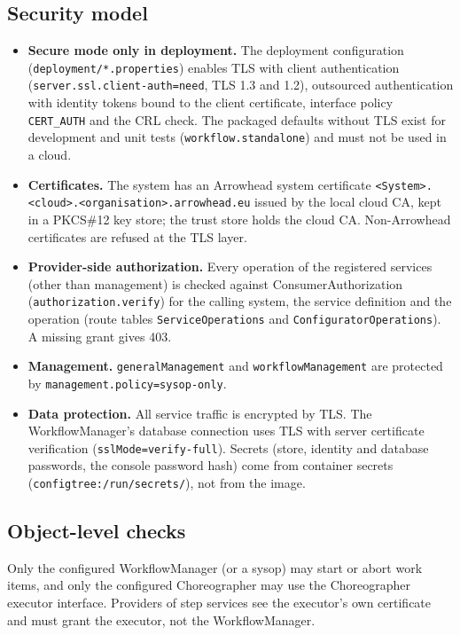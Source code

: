 \documentclass[a4paper]{arrowhead}
\begin{document}
\subsection{Security model}
\begin{itemize}
\item \textbf{Secure mode only in deployment.} The deployment configuration (\texttt{deployment/*.properties}) enables
TLS with client authentication (\texttt{server.ssl.client-auth=need}, TLS 1.3 and 1.2), outsourced authentication with
identity tokens bound to the client certificate, interface policy \texttt{CERT\_AUTH} and the CRL check. The packaged
defaults without TLS exist for development and unit tests (\texttt{workflow.standalone}) and must not be used in a
cloud.
\item \textbf{Certificates.} The system has an Arrowhead system certificate
\texttt{<System>.<cloud>.<organisation>.arrowhead.eu} issued by the local cloud CA, kept in a PKCS\#12 key store; the
trust store holds the cloud CA. Non-Arrowhead certificates are refused at the TLS layer.
\item \textbf{Provider-side authorization.} Every operation of the registered services (other than management) is
checked against ConsumerAuthorization (\texttt{authorization.verify}) for the calling system, the service definition
and the operation (route tables \texttt{ServiceOperations} and \texttt{ConfiguratorOperations}). A missing grant gives
403.
\item \textbf{Management.} \texttt{generalManagement} and \texttt{workflowManagement} are protected by
\texttt{management.policy=sysop-only}.
\item \textbf{Data protection.} All service traffic is encrypted by TLS. The WorkflowManager's database connection uses
TLS with server certificate verification (\texttt{sslMode=verify-full}). Secrets (store, identity and database
passwords, the console password hash) come from container secrets (\texttt{configtree:/run/secrets/}), not from the
image.
\end{itemize}


\subsection{Object-level checks}
Only the configured WorkflowManager (or a sysop) may start or abort work items, and only the configured Choreographer
may use the Choreographer executor interface. Providers of step services see the executor's own certificate and must
grant the executor, not the WorkflowManager.
\end{document}
